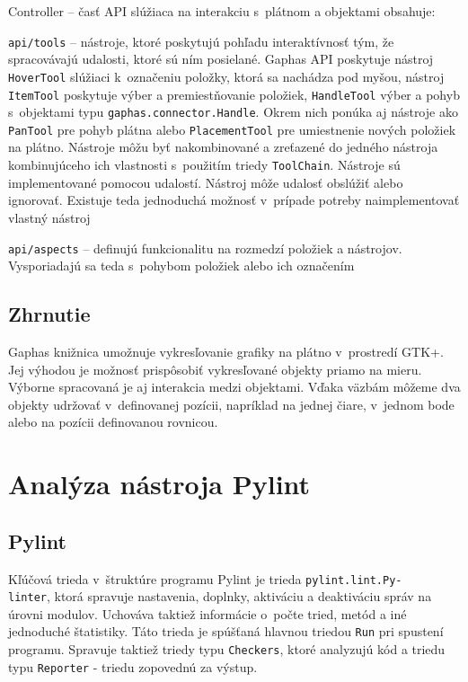 \documentclass[11pt,oneside,final]{fithesis2}
\begin{document}
\begin{list}{•}{}
\item Controller -- časť API slúžiaca na interakciu s~plátnom a objektami obsahuje:
    \begin{list}{•}{}
		\item \texttt{api/tools} -- nástroje, ktoré poskytujú pohľadu interaktívnosť tým, že spracovávajú udalosti, ktoré sú ním posielané. Gaphas API poskytuje nástroj \texttt{HoverTool} slúžiaci k~označeniu položky, ktorá sa nachádza pod myšou, nástroj \texttt{ItemTool} poskytuje výber a premiestňovanie položiek, \texttt{HandleTool} výber a pohyb s~objektami typu \texttt{gaphas.connector.Handle}. Okrem nich ponúka aj nástroje ako \texttt{PanTool} pre pohyb plátna alebo \texttt{PlacementTool} pre umiestnenie nových položiek na plátno. Nástroje môžu byť nakombinované a zreťazené do jedného nástroja kombinujúceho ich vlastnosti s~použitím triedy \texttt{ToolChain}. Nástroje sú implementované pomocou udalostí. Nástroj môže udalosť obslúžiť alebo ignorovať. Existuje teda jednoduchá možnosť v~prípade potreby naimplementovať vlastný nástroj
		\item \texttt{api/aspects} -- definujú funkcionalitu na rozmedzí položiek a nástrojov. Vysporiadajú sa teda s~pohybom položiek alebo ich označením
    \end{list}


\end{list}



	\subsection{Zhrnutie}

		Gaphas knižnica umožnuje vykresľovanie grafiky na plátno v~prostredí GTK+. Jej výhodou je možnosť prispôsobiť vykresľované objekty priamo na mieru. Výborne spracovaná je aj interakcia medzi objektami. Vďaka väzbám môžeme dva objekty udržovať v~definovanej pozícii, napríklad na jednej čiare, v~jednom bode alebo na pozícii definovanou rovnicou.
    
    
\section{Analýza nástroja Pylint}

	\subsection{Pylint}
		Kľúčová trieda v~štruktúre programu Pylint je trieda \texttt{pylint.lint.Py-\\linter}, ktorá spravuje nastavenia, doplnky, aktiváciu a deaktiváciu správ na úrovni modulov. Uchováva taktiež informácie o~počte tried, metód a iné jednoduché štatistiky. Táto trieda je spúšťaná hlavnou triedou \texttt{Run} pri spustení programu. Spravuje taktiež triedy typu \texttt{Checkers}, ktoré analyzujú kód a triedu typu \texttt{Reporter} - triedu zopovednú za výstup. 
		
\end{document}
